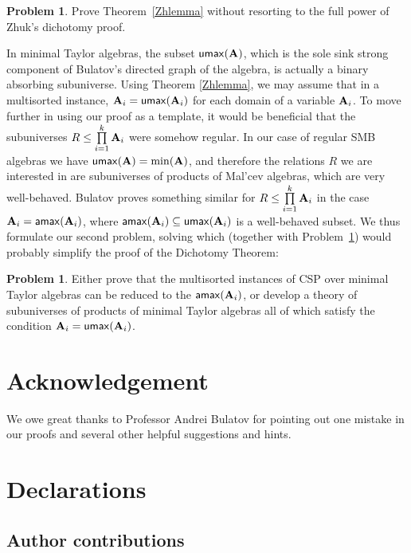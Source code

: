 \documentclass[11pt]{amsart}
\newcommand{\m}[1]{{\uppercase {\mathbf {#1}}}}
\theoremstyle{definition}
\newtheorem{prb}[thm]{Problem}
\begin{document}
\begin{prb}\label{prb1}
Prove Theorem~\ref{Zhlemma} without resorting to the full power of Zhuk's dichotomy proof.
\end{prb}

In minimal Taylor algebras, the subset $\mathsf{umax}(\m a)$, which is the sole sink strong component of Bulatov's directed graph of the algebra, is actually a binary absorbing subuniverse. Using Theorem \ref{Zhlemma}, we may assume that in a multisorted instance, $\m a_i=\mathsf{umax}(\m a_i)$ for each domain of a variable $\m a_i$. To move further in using our proof as a template, it would be beneficial that the subuniverses $R\leq \prod\limits_{i=1}^k\m a_i$ were somehow regular. In our case of regular SMB algebras we have $\mathsf{umax}(\m a)=\mathrm{min}(\m a)$, and therefore the relations $R$ we are interested in are subuniverses of products of Mal'cev algebras, which are very well-behaved. Bulatov proves something similar for $R\leq \prod\limits_{i=1}^k\m a_i$ in the case $\m a_i=\mathsf{amax}(\m a_i)$, where $\mathsf{amax}(\m a_i)\subseteq \mathsf{umax}(\m a_i)$ is a well-behaved subset. We thus formulate our second problem, solving which (together with Problem~\ref{prb1}) would probably simplify the proof of the Dichotomy Theorem:

\begin{prb}\label{prb2}
Either prove that the multisorted instances of CSP over minimal Taylor algebras can be reduced to the $\mathsf{amax}(\m a_i)$, or develop a theory of subuniverses of products of minimal Taylor algebras all of which satisfy the condition $\m a_i=\mathsf{umax}(\m a_i)$.
\end{prb}

\section*{Acknowledgement}

We owe great thanks to Professor Andrei Bulatov for pointing out one mistake in our proofs and several other helpful suggestions and hints.

\section*{Declarations}

\subsection*{Author contributions}
\end{document}
